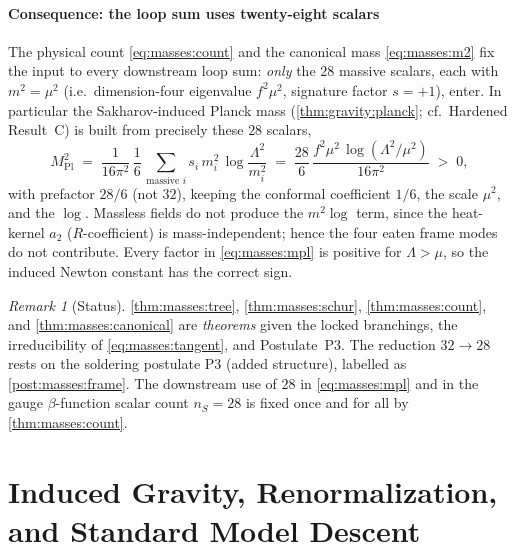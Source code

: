 \documentclass[11pt]{article}
\theoremstyle{plain}
\theoremstyle{definition}
\theoremstyle{remark}
\newtheorem{remark}[theorem]{Remark}
\begin{document}
\subsection{Consequence: the loop sum uses twenty-eight scalars}
\label{sec:masses:loopsum}

The physical count \eqref{eq:masses:count} and the canonical mass
\eqref{eq:masses:m2} fix the input to every downstream loop sum: \emph{only}
the $28$ massive scalars, each with $m^{2}=\mu^{2}$ (i.e.\ dimension-four
eigenvalue $f^{2}\mu^{2}$, signature factor $s=+1$), enter. In particular the
Sakharov-induced Planck mass (\autoref{thm:gravity:planck}; cf.\ Hardened
Result~C) is built from precisely these $28$ scalars,
\begin{equation}\label{eq:masses:mpl}
  M_{\mathrm{Pl}}^{2}
  \;=\;
  \frac{1}{16\pi^{2}}\,\frac{1}{6}\,
  \sum_{\text{massive }i} s_{i}\,m_{i}^{2}\,\log\frac{\Lambda^{2}}{m_{i}^{2}}
  \;=\;
  \frac{28}{6}\,\frac{f^{2}\mu^{2}\,\log(\Lambda^{2}/\mu^{2})}{16\pi^{2}}
  \;>\;0,
\end{equation}
with prefactor $28/6$ (not $32$), keeping the conformal coefficient $1/6$, the
scale $\mu^{2}$, and the $\log$. Massless fields do not produce the $m^{2}\log$
term, since the heat-kernel $a_{2}$ ($R$-coefficient) is mass-independent;
hence the four eaten frame modes do not contribute. Every factor in
\eqref{eq:masses:mpl} is positive for $\Lambda>\mu$, so the induced Newton
constant has the correct sign.

\begin{remark}[Status]\label{rmk:masses:status}
\autoref{thm:masses:tree}, \autoref{thm:masses:schur},
\autoref{thm:masses:count}, and \autoref{thm:masses:canonical} are
\emph{theorems} given the locked branchings, the irreducibility of
\eqref{eq:masses:tangent}, and Postulate~P3. The reduction $32\to 28$ rests on
the soldering postulate P3 (added structure), labelled as
\autoref{post:masses:frame}. The downstream
use of $28$ in \eqref{eq:masses:mpl} and in the gauge $\beta$-function scalar
count $n_{S}=28$ is fixed once and for all by \autoref{thm:masses:count}.
\end{remark}
\part{Induced Gravity, Renormalization, and Standard Model Descent}
\end{document}
